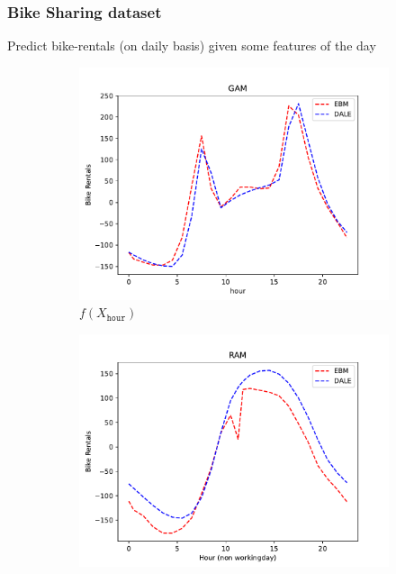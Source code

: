 \documentclass{beamer}
\begin{document}
\begin{frame}
  \frametitle{Bike Sharing dataset}
  Predict bike-rentals (on daily basis) given some features of the day
  \noindent\makebox[\linewidth]{\rule{\paperwidth}{0.4pt}}
\begin{figure}[htbp]
    \centering
    \begin{subfigure}{0.32\textwidth}
        \centering
        \includegraphics[width=\textwidth]{figures/bike_rentals_gam}
        \caption{\(f(X_{\mathtt{hour}})\)}
        \label{subfig:bike_rentals_gam}
    \end{subfigure}
    \begin{subfigure}{0.32\textwidth}
        \centering
        \includegraphics[width=\textwidth]{figures/bike_rentals_ram_1}

\end{subfigure}
\end{figure}
\end{frame}
\end{document}
